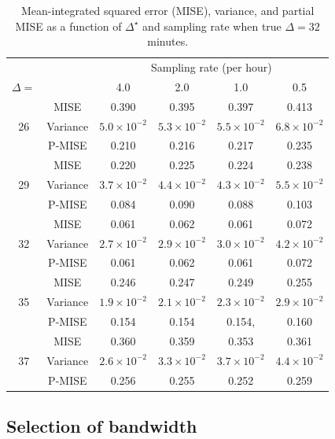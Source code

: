 \documentclass[12pt]{amsart}
\newenvironment{newmaterial}{\color{blue}}{\par}
\begin{document}
\begin{table}[!th]
\begin{tabular}{c | c c c c c}
& & \multicolumn{4}{c}{Sampling rate (per hour)} \\ \cline{3-6}
$\Delta=$ & & 4.0 & 2.0 & 1.0 & 0.5 \\ \hline
\multirow{3}{*}{26} & MISE & 0.390 & 0.395 & 0.397 & 0.413 \\
 & Variance & $5.0 \times 10^{-2}$ & $5.3 \times 10^{-2}$ & $5.5 \times 10^{-2}$ & $6.8 \times 10^{-2}$ \\
  & P-MISE & 0.210 & 0.216 & 0.217 & 0.235 \\ \hline
\multirow{3}{*}{29} & MISE & 0.220 & 0.225 & 0.224 & 0.238 \\
 & Variance & $3.7 \times 10^{-2}$ & $4.4 \times 10^{-2}$ & $4.3 \times 10^{-2}$ & $5.5 \times 10^{-2}$ \\
  & P-MISE & 0.084 & 0.090 & 0.088 & 0.103 \\ \hline
\multirow{3}{*}{32} & MISE & 0.061 & 0.062 & 0.061 & 0.072 \\
 & Variance & $2.7 \times 10^{-2}$ & $2.9 \times 10^{-2}$ & $3.0 \times 10^{-2}$ & $4.2 \times 10^{-2}$ \\
  & P-MISE & 0.061 & 0.062 & 0.061 & 0.072 \\\hline
\multirow{3}{*}{35} & MISE & 0.246 & 0.247 & 0.249 & 0.255 \\
 & Variance & $1.9 \times 10^{-2}$ & $2.1 \times 10^{-2}$ & $2.3 \times 10^{-2}$ & $2.9 \times 10^{-2}$ \\
  & P-MISE & 0.154 & 0.154 & 0.154, & 0.160 \\\hline
\multirow{3}{*}{37} & MISE & 0.360 & 0.359 & 0.353 & 0.361 \\
 & Variance & $2.6 \times 10^{-2}$ & $3.3 \times 10^{-2}$ & $3.7 \times 10^{-2}$ & $4.4 \times 10^{-2}$ \\
  & P-MISE & 0.256 & 0.255 & 0.252 & 0.259 \\\hline
\end{tabular}
\caption{Mean-integrated squared error (MISE), variance, and partial MISE as a function of $\Delta^\star$ and sampling rate when true $\Delta = 32$ minutes.
}
\label{tab:mise_delta}
\end{table}

\subsection{Selection of bandwidth} \label{section:bandwidth}
\end{document}
